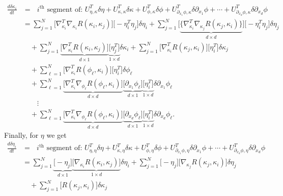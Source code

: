 \documentclass[noinfoline]{imsart}
\begin{document}
{\begin{align}
\frac{d\delta\kappa_i}{dt} &= \text{ $i^{\text{th}}$ segment of: }U_{\eta,\kappa}^T\delta\eta + U_{\kappa,\kappa}^T\delta\kappa + U_{\phi,\kappa}^T\delta\phi +  U_{\partial_{x_1} \phi,\kappa}^T\delta\partial_{x_1} \phi + \cdots  +  U_{\partial_{x_d} \phi,\kappa}^T\delta\partial_{x_d} \phi \\
&= \sum_{j=1}^N  \bigl[  \nabla^T_{\kappa_i}\nabla_{\kappa_i}R(\kappa_i,\kappa_j)  \bigr] \bigl[-\eta^T_i \eta_j\bigr] \delta\eta_i +\sum_{j=1}^N   \bigl[   \underbrace{ \{\nabla^T_{\kappa_i}\nabla_{\kappa_j}R(\kappa_j,\kappa_i)\} }_{d\times d}\bigr]{\bigl[-\eta^T_i \eta_j\bigr]}\delta\eta_j  \\
&\quad+\sum_{j=1}^N  \underbrace{\bigl[ \nabla^T_{\kappa_i} R(\kappa_i,\kappa_j)\bigr]}_{d\times 1} \underbrace{\bigl[\eta_j^T\bigr]}_{1\times d} \delta\kappa_i +\sum_{j=1}^N \bigl[ \nabla_{\kappa_i}^T R(\kappa_j,\kappa_i) \bigr]  \bigl[\eta_i^T\bigr] \delta\kappa_j \\
&\quad  + \sum_{\ell=1}^N \bigl[   \nabla^T_{\kappa_i}R(\phi_\ell,\kappa_i) \bigr] \bigl[\eta_i^T\bigr]\delta\phi_\ell \\
&\quad + \sum_{\ell=1}^N \underbrace{\bigl[\nabla_{\kappa_i}^T\nabla_{\phi_\ell}R(\phi_\ell,\kappa_i)\bigr]}_{d\times d}     \underbrace{\bigl[\partial_{x_1} {\phi_\ell}\bigr]}_{d\times 1}  \underbrace{\bigl[\eta_i^T\bigr]}_{1 \times d}  \delta\partial_{x_1}\phi_\ell  \\
 &\qquad\vdots \nonumber\\ 
&\quad + \sum_{\ell=1}^N \underbrace{\bigl[\nabla_{\kappa_i}^T\nabla_{\phi_\ell}R(\phi_\ell,\kappa_i)\bigr]}_{d\times d}     \underbrace{\bigl[\partial_{x_d} {\phi_\ell}\bigr]}_{d\times 1}  \underbrace{\bigl[\eta_i^T\bigr]}_{1 \times d}  \delta\partial_{x_d}\phi_\ell .
\end{align}
Finally, for $\eta$ we get
\begin{align}
\frac{d\delta\eta_i}{dt} &= \text{ $i^{\text{th}}$ segment of: }  U_{\eta,\eta}^T\delta\eta + U_{\kappa,\eta}^T\delta\kappa + U_{\phi,\eta}^T\delta\phi +  U_{\partial_{x_1} \phi,\eta}^T\delta\partial_{x_1} \phi + \cdots  +  U_{\partial_{x_d} \phi,\eta}^T\delta\partial_{x_d} \phi \\
&=   \sum_{j=1}^N  \underbrace{\bigl[-  \eta_j   \bigr]}_{d\times 1} \underbrace{ \bigl[ \nabla_{\kappa_i}R(\kappa_i,\kappa_j)\bigr]}_{1\times d} \delta\eta_i  + \sum_{j=1}^N  \bigl[- \eta_j     \bigr] \bigl[\nabla_{\kappa_j}R(\kappa_j,\kappa_i)\bigr] \delta\eta_j   \\
&\quad+\sum_{j=1}^N  \bigl[R(\kappa_j,\kappa_i)\bigr] \delta\kappa_j  \\

\end{align}}
\end{document}
